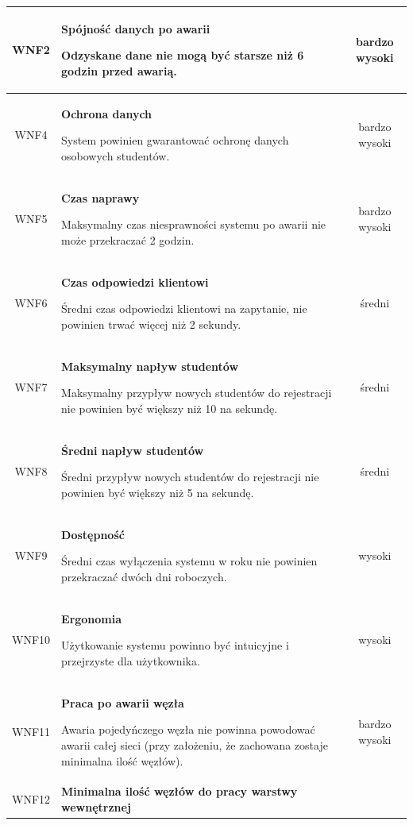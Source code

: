 {\begin{tabularx}{\textwidth}{|c|X|c|}
\label{z:WNF2} WNF2 & \textbf{Spójność danych po awarii} 
 
Odzyskane dane nie mogą być starsze niż 6 godzin przed awarią.
 & bardzo wysoki\\
\hline

\label{z:WNF4} WNF4 & \textbf{Ochrona danych} 
 
System powinien gwarantować ochronę danych osobowych studentów.
 & bardzo wysoki\\
\hline

\label{z:WNF5} WNF5 & \textbf{Czas naprawy} 
 
Maksymalny czas niesprawności systemu po awarii nie może przekraczać 2 godzin.
 & bardzo wysoki\\
\hline

\label{z:WNF6} WNF6 & \textbf{Czas odpowiedzi klientowi} 
 
Średni czas odpowiedzi klientowi na zapytanie, nie powinien trwać więcej niż  2 sekundy.
 & średni\\
\hline

\label{z:WNF7} WNF7 & \textbf{Maksymalny napływ studentów} 
 
Maksymalny przypływ nowych studentów do rejestracji nie powinien być większy niż 10 na sekundę.
 & średni\\
\hline

\label{z:WNF8} WNF8 & \textbf{Średni napływ studentów} 
 
Średni przypływ nowych studentów do rejestracji nie powinien być większy niż 5 na sekundę.
 & średni\\
\hline

\label{z:WNF9} WNF9 & \textbf{Dostępność} 
 
Średni czas wyłączenia systemu w roku nie powinien przekraczać dwóch dni roboczych.
 & wysoki\\
\hline

\label{z:WNF10} WNF10 & \textbf{Ergonomia} 
 
Użytkowanie systemu powinno być intuicyjne i przejrzyste dla użytkownika.
 & wysoki\\
\hline

\label{z:WNF11} WNF11 & \textbf{Praca po awarii węzła} 
 
Awaria pojedyńczego węzła nie powinna powodować awarii całej sieci (przy założeniu, że zachowana zostaje minimalna ilość węzłów).
 & bardzo wysoki\\
\hline

\label{z:WNF12} WNF12 & \textbf{Minimalna ilość węzłów do pracy warstwy wewnętrznej} 
 

\end{tabularx}}
